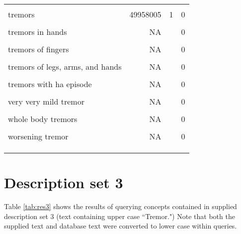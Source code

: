 \documentclass[10pt, letterpaper]{article}
\begin{document}
\begin{spacing}{1.0}
\begin{footnotesize}
\begin{longtable}[H]{p{4in}rrr}
        & & &\\[-6pt]
        tremors & 49958005 & 1 & 0\\
        & & &\\[-6pt]
        tremors in hands & NA &  & 0\\
        & & &\\[-6pt]
        tremors of fingers & NA &  & 0\\
        & & &\\[-6pt]
        tremors of legs, arms, and hands & NA &  & 0\\
        & & &\\[-6pt]
        tremors with ha episode & NA &  & 0\\
        & & &\\[-6pt]
        very very mild tremor & NA &  & 0\\
        & & &\\[-6pt]
        whole body tremors & NA &  & 0\\
        & & &\\[-6pt]
        worsening tremor & NA &  & 0\\
        & & &\\[-6pt]
        \hline\\[-6pt]
        \label{tab:res2}
    \end{longtable}
\end{footnotesize}

\section*{Description set 3}

Table \ref{tab:res3} shows the results of querying concepts contained in supplied description set 3 (text containing upper case ``Tremor.")  Note that both the supplied text and database text were converted to lower case within queries.

\vspace{0.25in}


\end{spacing}
\end{document}
